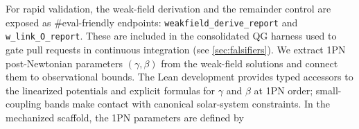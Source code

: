 \documentclass[aps,prd,twocolumn,superscriptaddress,nofootinbib,floatfix,longbibliography]{revtex4-2}
\newcommand{\Order}{\mathcal{O}}
\newcommand{\lean}[1]{\texttt{\detokenize{#1}}}
\begin{document}
%
%
For rapid validation, the weak-field derivation and the remainder control are exposed as \#eval-friendly endpoints: \texttt{weakfield\_derive\_report} and \texttt{w\_link\_O\_report}. These are included in the consolidated QG harness used to gate pull requests in continuous integration (see \ref{sec:falsifiers}).
%
%
We extract 1PN post-Newtonian parameters $(\gamma,\beta)$ from the weak-field solutions and connect them to observational bounds. The Lean development provides typed accessors to the linearized potentials and explicit formulas for $\gamma$ and $\beta$ at 1PN order; small-coupling bands make contact with canonical solar-system constraints.
%
In the mechanized scaffold, the 1PN parameters are defined by
\end{document}
